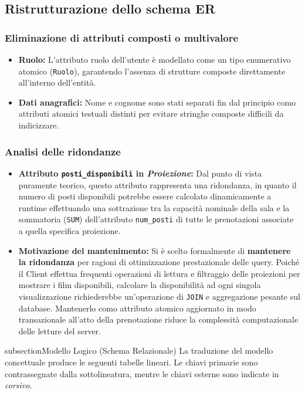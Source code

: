 \documentclass{article}
\begin{document}
\subsection{Ristrutturazione dello schema ER}

\subsubsection{Eliminazione di attributi composti o multivalore}
\begin{itemize}
    \item \textbf{Ruolo:} L'attributo ruolo dell'utente è modellato come un tipo enumerativo atomico (\texttt{Ruolo}), garantendo l'assenza di strutture composte direttamente all'interno dell'entità.
    \item \textbf{Dati anagrafici:} Nome e cognome sono stati separati fin dal principio como attributi atomici testuali distinti per evitare stringhe composte difficili da indicizzare.
\end{itemize}

\subsubsection{Analisi delle ridondanze}
\begin{itemize}
    \item \textbf{Attributo \texttt{posti\_disponibili} in \textit{Proiezione}:} Dal punto di vista puramente teorico, questo attributo rappresenta una ridondanza, in quanto il numero di posti disponibili potrebbe essere calcolato dinamicamente a runtime effettuando una sottrazione tra la capacità nominale della sala e la sommatoria (\texttt{SUM}) dell'attributo \texttt{num\_posti} di tutte le prenotazioni associate a quella specifica proiezione.
    \item \textbf{Motivazione del mantenimento:} Si è scelto formalmente di \textbf{mantenere la ridondanza} per ragioni di ottimizzazione prestazionale delle query. Poiché il Client effettua frequenti operazioni di lettura e filtraggio delle proiezioni per mostrare i film disponibili, calcolare la disponibilità ad ogni singola visualizzazione richiederebbe un'operazione di \texttt{JOIN} e aggregazione pesante sul database. Mantenerlo como attributo atomico aggiornato in modo transazionale all'atto della prenotazione riduce la complessità computazionale delle letture del server.
\end{itemize}
subsection{Modello Logico (Schema Relazionale)}
La traduzione del modello concettuale produce le seguenti tabelle lineari. Le chiavi primarie sono contrassegnate dalla sottolineatura, mentre le chiavi esterne sono indicate in \textit{corsivo}.
\end{document}
